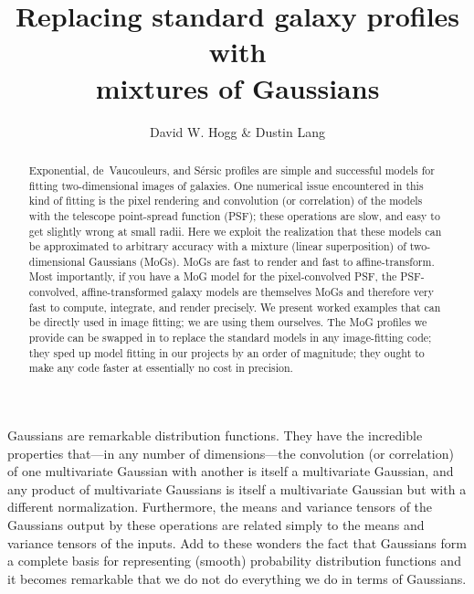 \documentclass[12pt,pdftex,preprint]{aastex}
\begin{document}
\title{Replacing standard galaxy profiles with \\ mixtures of Gaussians}
\author{David W. Hogg \&
        Dustin Lang}

\begin{abstract}
Exponential, de~Vaucouleurs, and S\'ersic profiles are simple and
successful models for fitting two-dimensional images of galaxies.  One
numerical issue encountered in this kind of fitting is the pixel
rendering and convolution (or correlation) of the models with the
telescope point-spread function (PSF); these operations are slow, and
easy to get slightly wrong at small radii.  Here we exploit the
realization that these models can be approximated to arbitrary
accuracy with a mixture (linear superposition) of two-dimensional
Gaussians (MoGs).  MoGs are fast to render and fast to
affine-transform.  Most importantly, if you have a MoG model for the
pixel-convolved PSF, the PSF-convolved, affine-transformed galaxy
models are themselves MoGs and therefore very fast to compute,
integrate, and render precisely.  We present worked examples that can
be directly used in image fitting; we are using them ourselves.  The
MoG profiles we provide can be swapped in to replace the standard
models in any image-fitting code; they sped up model fitting in our
projects by an order of magnitude; they ought to make any code faster
at essentially no cost in precision.
\end{abstract}

Gaussians are remarkable distribution functions.  They have the
incredible properties that---in any number of dimensions---the
convolution (or correlation) of one multivariate Gaussian with another
is itself a multivariate Gaussian, and any product of multivariate
Gaussians is itself a multivariate Gaussian but with a different
normalization.  Furthermore, the means and variance tensors of the
Gaussians output by these operations are related simply to the means
and variance tensors of the inputs.  Add to these wonders the fact
that Gaussians form a complete basis for representing (smooth)
probability distribution functions and it becomes remarkable that we
do not do everything we do in terms of Gaussians.
\end{document}
